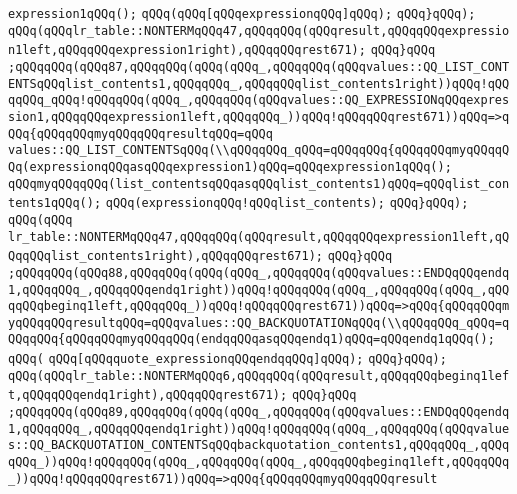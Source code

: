 \verb|expression1qQQq();|\newline
\verb|qQQq(qQQq[qQQqexpressionqQQq]qQQq);|\newline
\verb|qQQq}qQQq);|\newline
\verb|qQQq(qQQqlr_table::NONTERMqQQq47,qQQqqQQq(qQQqresult,qQQqqQQqexpression1left,qQQqqQQqexpression1right),qQQqqQQqrest671);|\newline
\verb|qQQq}qQQq|\newline
\verb|;qQQqqQQq(qQQq87,qQQqqQQq(qQQq(qQQq_,qQQqqQQq(qQQqvalues::QQ_LIST_CONTENTSqQQqlist_contents1,qQQqqQQq_,qQQqqQQqlist_contents1right))qQQq!qQQqqQQq_qQQq!qQQqqQQq(qQQq_,qQQqqQQq(qQQqvalues::QQ_EXPRESSIONqQQqexpression1,qQQqqQQqexpression1left,qQQqqQQq_))qQQq!qQQqqQQqrest671))qQQq=>qQQq{qQQqqQQqmyqQQqqQQqresultqQQq=qQQq|\newline
\verb|values::QQ_LIST_CONTENTSqQQq(\\qQQqqQQq_qQQq=qQQqqQQq{qQQqqQQqmyqQQqqQQq(expressionqQQqasqQQqexpression1)qQQq=qQQqexpression1qQQq();|\newline
\verb|qQQqmyqQQqqQQq(list_contentsqQQqasqQQqlist_contents1)qQQq=qQQqlist_contents1qQQq();|\newline
\verb|qQQq(expressionqQQq!qQQqlist_contents);|\newline
\verb|qQQq}qQQq);|\newline
\verb|qQQq(qQQq|\newline
\verb|lr_table::NONTERMqQQq47,qQQqqQQq(qQQqresult,qQQqqQQqexpression1left,qQQqqQQqlist_contents1right),qQQqqQQqrest671);|\newline
\verb|qQQq}qQQq|\newline
\verb|;qQQqqQQq(qQQq88,qQQqqQQq(qQQq(qQQq_,qQQqqQQq(qQQqvalues::ENDQqQQqendq1,qQQqqQQq_,qQQqqQQqendq1right))qQQq!qQQqqQQq(qQQq_,qQQqqQQq(qQQq_,qQQqqQQqbeginq1left,qQQqqQQq_))qQQq!qQQqqQQqrest671))qQQq=>qQQq{qQQqqQQqmyqQQqqQQqresultqQQq=qQQqvalues::QQ_BACKQUOTATIONqQQq(\\qQQqqQQq_qQQq=qQQqqQQq{qQQqqQQqmyqQQqqQQq(endqqQQqasqQQqendq1)qQQq=qQQqendq1qQQq();|\newline
\verb|qQQq(|\newline
\verb|qQQq[qQQqquote_expressionqQQqendqqQQq]qQQq);|\newline
\verb|qQQq}qQQq);|\newline
\verb|qQQq(qQQqlr_table::NONTERMqQQq6,qQQqqQQq(qQQqresult,qQQqqQQqbeginq1left,qQQqqQQqendq1right),qQQqqQQqrest671);|\newline
\verb|qQQq}qQQq|\newline
\verb|;qQQqqQQq(qQQq89,qQQqqQQq(qQQq(qQQq_,qQQqqQQq(qQQqvalues::ENDQqQQqendq1,qQQqqQQq_,qQQqqQQqendq1right))qQQq!qQQqqQQq(qQQq_,qQQqqQQq(qQQqvalues::QQ_BACKQUOTATION_CONTENTSqQQqbackquotation_contents1,qQQqqQQq_,qQQqqQQq_))qQQq!qQQqqQQq(qQQq_,qQQqqQQq(qQQq_,qQQqqQQqbeginq1left,qQQqqQQq_))qQQq!qQQqqQQqrest671))qQQq=>qQQq{qQQqqQQqmyqQQqqQQqresult|\newline
